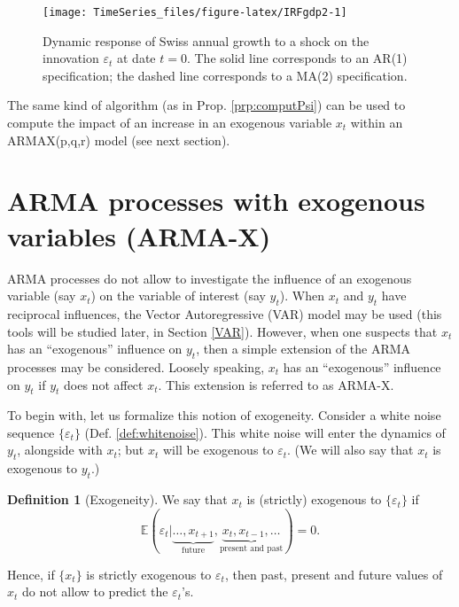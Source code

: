 \documentclass[
  12pt,
]{book}
\theoremstyle{definition}
\newtheorem{definition}{Definition}[chapter]
\theoremstyle{definition}
\theoremstyle{definition}
\theoremstyle{definition}
\theoremstyle{remark}
\begin{document}
\begin{figure}
\texttt{[image: TimeSeries\_files/figure-latex/IRFgdp2-1]} \caption{Dynamic response of Swiss annual growth to a shock on the innovation $\varepsilon_t$ at date $t=0$. The solid line corresponds to an AR(1) specification; the dashed line corresponds to a MA(2) specification.}\label{fig:IRFgdp2}
\end{figure}

The same kind of algorithm (as in Prop. \ref{prp:computPsi}) can be used to compute the impact of an increase in an exogenous variable \(x_t\) within an ARMAX(p,q,r) model (see next section).

\hypertarget{ARMAIRF}{%
\section{ARMA processes with exogenous variables (ARMA-X)}\label{ARMAIRF}}

ARMA processes do not allow to investigate the influence of an exogenous variable (say \(x_t\)) on the variable of interest (say \(y_t\)). When \(x_t\) and \(y_t\) have reciprocal influences, the Vector Autoregressive (VAR) model may be used (this tools will be studied later, in Section \ref{VAR}). However, when one suspects that \(x_t\) has an ``exogenous'' influence on \(y_t\), then a simple extension of the ARMA processes may be considered. Loosely speaking, \(x_t\) has an ``exogenous'' influence on \(y_t\) if \(y_t\) does not affect \(x_t\). This extension is referred to as ARMA-X.

To begin with, let us formalize this notion of exogeneity. Consider a white noise sequence \(\{\varepsilon_t\}\) (Def. \ref{def:whitenoise}). This white noise will enter the dynamics of \(y_t\), alongside with \(x_t\); but \(x_t\) will be exogenous to \(\varepsilon_t\). (We will also say that \(x_t\) is exogenous to \(y_t\).)

\begin{definition}[Exogeneity]
\protect\hypertarget{def:exogeneity}{}\label{def:exogeneity}We say that \(x_t\) is (strictly) exogenous to \(\{\varepsilon_t\}\) if
\[
\mathbb{E}(\varepsilon_t|\underbrace{\dots,x_{t+1}}_{\mbox{future}},\underbrace{x_t,x_{t-1},\dots}_{\mbox{present and past}}) = 0.
\]
\end{definition}

Hence, if \(\{x_t\}\) is strictly exogenous to \(\varepsilon_t\), then past, present and future values of \(x_t\) do not allow to predict the \(\varepsilon_t\)'s.
\end{document}
